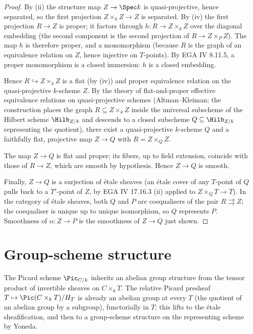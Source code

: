 \begin{proof}

\leanok
  By (ii) the structure map \(Z \to \Spec k\) is quasi-projective, hence
  separated, so the first projection \(Z \times_k Z \to Z\) is separated.
  By (iv) the first projection \(R \to Z\) is proper; it factors through
  \(h : R \to Z \times_k Z\) over the diagonal embedding (the second
  component is the second projection of \(R \to Z \times_P Z\)). The map
  \(h\) is therefore proper, and a monomorphism (because \(R\) is the graph
  of an equivalence relation on \(Z\), hence injective on \(T\)-points).
  By EGA IV 8.11.5, a proper monomorphism is a closed immersion: \(h\) is a
  closed embedding.

  Hence \(R \hookrightarrow Z \times_k Z\) is a flat (by (iv)) and proper
  equivalence relation on the quasi-projective \(k\)-scheme \(Z\). By the
  theory of flat-and-proper effective equivalence relations on
  quasi-projective schemes (Altman--Kleiman; the construction places
  the graph \(R \subseteq Z \times_k Z\) inside the universal subscheme of
  the Hilbert scheme \(\Hilb_{Z/k}\) and descends to a closed subscheme
  \(Q \subseteq \Hilb_{Z/k}\) representing the quotient), there exist a
  quasi-projective \(k\)-scheme \(Q\) and a faithfully flat, projective map
  \(Z \to Q\) with \(R = Z \times_Q Z\).

  The map \(Z \to Q\) is flat and proper; its fibers, up to field
  extension, coincide with those of \(R \to Z\), which are smooth by
  hypothesis. Hence \(Z \to Q\) is smooth.

  Finally, \(Z \to Q\) is a surjection of \'etale sheaves (an \'etale
  cover of any \(T\)-point of \(Q\) pulls back to a \(T'\)-point of \(Z\), by
  EGA IV 17.16.3 (ii) applied to \(Z \times_Q T \to T\)). In the category
  of \'etale sheaves, both \(Q\) and \(P\) are coequalisers of the pair
  \(R \rightrightarrows Z\); the coequaliser is unique up to unique
  isomorphism, so \(Q\) represents \(P\). Smoothness of \(\alpha : Z \to P\)
  is the smoothness of \(Z \to Q\) just shown.
\end{proof}

\section{Group-scheme structure}
\label{sec:fga_pic_group_structure}

The Picard scheme \(\Pic_{C/k}\) inherits an abelian group structure from
the tensor product of invertible sheaves on \(C \times_k T\). The relative
Picard presheaf \(T \mapsto \Pic(C \times_k T)/H_T\) is already an abelian
group at every \(T\) (the quotient of an abelian group by a subgroup),
functorially in \(T\); this lifts to the \'etale sheafification, and then
to a group-scheme structure on the representing scheme by Yoneda.

